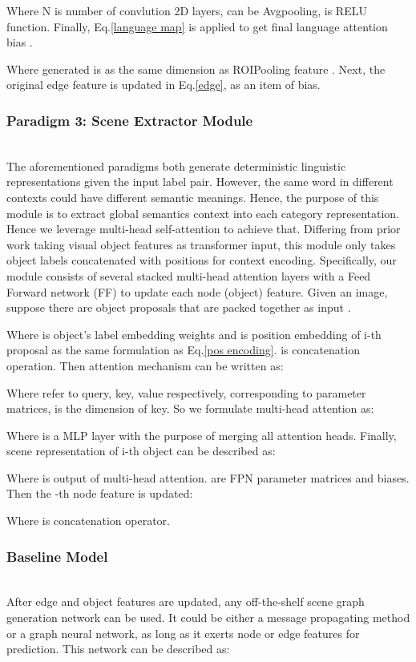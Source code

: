 \documentclass[runningheads]{llncs}
\begin{document}
Where N is number of convlution 2D layers,  can be
Avgpooling,  is RELU function.
Finally, Eq.\ref{language map}	is applied to get final language attention bias
.

Where generated  is as the
same dimension  as ROIPooling  feature . Next, the original
edge feature  is updated in Eq.\ref{edge}, as an item of bias.

\subsubsection{Paradigm 3: Scene Extractor Module}~\\

The aforementioned paradigms both generate deterministic linguistic
representations given the input label pair. However, the same word in different
contexts could have different semantic meanings. Hence, the purpose of this
module is to extract global semantics context into each category
representation. Hence we leverage multi-head self-attention to achieve that.
Differing from prior work\cite{seq2seq} taking visual object features as
transformer input, this module only takes object labels concatenated with
positions for context encoding.  Specifically, our module consists of several
stacked multi-head attention layers with a Feed Forward network (FF) to update
each node (object) feature. Given an image, suppose there are  object
proposals that are packed together as input .


Where  is object's label embedding weights  and  is position
embedding of i-th proposal as the same formulation as Eq.\ref{pos encoding}.  is concatenation operation. Then attention mechanism can be
written as:

Where  refer to query, key, value
respectively,  corresponding to parameter matrices, 
is the dimension of key. So we formulate multi-head attention as:


Where  is a MLP layer with the purpose of merging all attention heads.
Finally, scene representation of i-th object   can be described as:


Where  is output of multi-head attention.  are FPN
parameter matrices and biases.
Then the -th node feature  is updated:


Where  is concatenation operator.
\subsubsection{Baseline Model}~\\
After edge and object features are updated, any off-the-shelf scene graph
generation network can be used. It could be either a message propagating method
or a graph neural network, as long as it exerts node or edge features for
prediction. This network can be described as:
\end{document}
